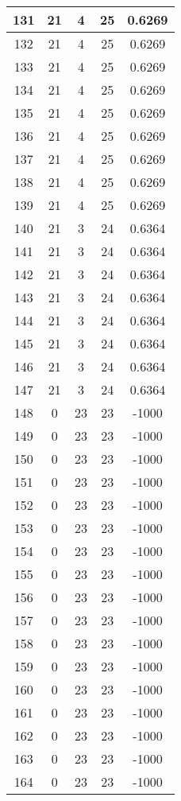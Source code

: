 \documentclass[letterpaper, 12pt]{article}
\begin{document}
\begin{longtable}{|c|c|c|c|c|}
\hline
131 & 21 & 4 & 25 & 0.6269 \\
\hline
132 & 21 & 4 & 25 & 0.6269 \\
\hline
133 & 21 & 4 & 25 & 0.6269 \\
\hline
134 & 21 & 4 & 25 & 0.6269 \\
\hline
135 & 21 & 4 & 25 & 0.6269 \\
\hline
136 & 21 & 4 & 25 & 0.6269 \\
\hline
137 & 21 & 4 & 25 & 0.6269 \\
\hline
138 & 21 & 4 & 25 & 0.6269 \\
\hline
139 & 21 & 4 & 25 & 0.6269 \\
\hline
140 & 21 & 3 & 24 & 0.6364 \\
\hline
141 & 21 & 3 & 24 & 0.6364 \\
\hline
142 & 21 & 3 & 24 & 0.6364 \\
\hline
143 & 21 & 3 & 24 & 0.6364 \\
\hline
144 & 21 & 3 & 24 & 0.6364 \\
\hline
145 & 21 & 3 & 24 & 0.6364 \\
\hline
146 & 21 & 3 & 24 & 0.6364 \\
\hline
147 & 21 & 3 & 24 & 0.6364 \\
\hline
148 & 0 & 23 & 23 & -1000 \\
\hline
149 & 0 & 23 & 23 & -1000 \\
\hline
150 & 0 & 23 & 23 & -1000 \\
\hline
151 & 0 & 23 & 23 & -1000 \\
\hline
152 & 0 & 23 & 23 & -1000 \\
\hline
153 & 0 & 23 & 23 & -1000 \\
\hline
154 & 0 & 23 & 23 & -1000 \\
\hline
155 & 0 & 23 & 23 & -1000 \\
\hline
156 & 0 & 23 & 23 & -1000 \\
\hline
157 & 0 & 23 & 23 & -1000 \\
\hline
158 & 0 & 23 & 23 & -1000 \\
\hline
159 & 0 & 23 & 23 & -1000 \\
\hline
160 & 0 & 23 & 23 & -1000 \\
\hline
161 & 0 & 23 & 23 & -1000 \\
\hline
162 & 0 & 23 & 23 & -1000 \\
\hline
163 & 0 & 23 & 23 & -1000 \\
\hline
164 & 0 & 23 & 23 & -1000 \\

\end{longtable}
\end{document}
